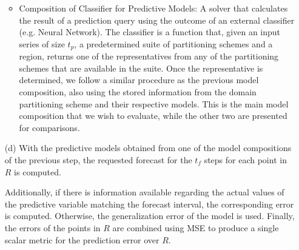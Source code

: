 \begin{itemize}
\begin{itemize}
	\item Composition of Classifier for Predictive Models: A solver that calculates the result of a prediction query using the outcome of an external classifier (e.g. Neural Network). The classifier is a function that, given an input series of size $t_p$, a predetermined suite of partitioning schemes and a region, returns one of the representatives from any of the partitioning schemes that are available in the suite. Once the representative is determined, we follow a similar procedure as the previous model composition, also using the stored information from the domain partitioning scheme and their respective models. This is the main model composition that we wish to evaluate, while the other two are presented for comparisons.

   \end{itemize}
    \item [(d)] With the predictive models obtained from one of the model compositions of the previous step, the requested forecast for the $t_{f}$ steps for each point in $R$ is computed. 
    
    Additionally, if there is information available regarding the actual values of the predictive variable matching the forecast interval, the corresponding error is computed. Otherwise, the generalization error of the model is used. Finally, the errors of the points in $R$ are combined using MSE to produce a single scalar metric for the prediction error over $R$.
\end{itemize}



